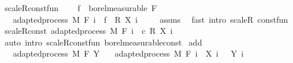 \begin{isabellebody}
\ scaleR{\isacharunderscore}{\kern0pt}const{\isacharunderscore}{\kern0pt}fun{\isacharcolon}{\kern0pt}\ \isanewline
\ \ \ {\isachardoublequoteopen}f\ {\isasymin}\ borel{\isacharunderscore}{\kern0pt}measurable\ {\isacharparenleft}{\kern0pt}F\ {\isasymbottom}{\isacharparenright}{\kern0pt}{\isachardoublequoteclose}\ \isanewline
\ \ \ {\isachardoublequoteopen}adapted{\isacharunderscore}{\kern0pt}process\ M\ F\ {\isacharparenleft}{\kern0pt}{\isasymlambda}i\ {\isasymxi}{\isachardot}{\kern0pt}\ f\ {\isasymxi}\ {\isacharasterisk}{\kern0pt}\isactrlsub R\ {\isacharparenleft}{\kern0pt}X\ i\ {\isasymxi}{\isacharparenright}{\kern0pt}{\isacharparenright}{\kern0pt}{\isachardoublequoteclose}\isanewline
%
\isadelimproof
\ \ %
\endisadelimproof
%
\isatagproof
{}\isamarkupfalse%
\ assms\ \isamarkupfalse%
\ {\isacharparenleft}{\kern0pt}fast\ intro{\isacharcolon}{\kern0pt}\ scaleR\ const{\isacharunderscore}{\kern0pt}fun{\isacharparenright}{\kern0pt}%
\endisatagproof
{\isafoldproof}%
%
\isadelimproof
\isanewline
%
\endisadelimproof
\isanewline
{}\isamarkupfalse%
\ scaleR{\isacharunderscore}{\kern0pt}const{\isacharcolon}{\kern0pt}\ {\isachardoublequoteopen}adapted{\isacharunderscore}{\kern0pt}process\ M\ F\ {\isacharparenleft}{\kern0pt}{\isasymlambda}i\ {\isasymxi}{\isachardot}{\kern0pt}\ c\ {\isacharasterisk}{\kern0pt}\isactrlsub R\ {\isacharparenleft}{\kern0pt}X\ i\ {\isasymxi}{\isacharparenright}{\kern0pt}{\isacharparenright}{\kern0pt}{\isachardoublequoteclose}%
\isadelimproof
\ %
\endisadelimproof
%
\isatagproof
{}\isamarkupfalse%
\ {\isacharparenleft}{\kern0pt}auto\ intro{\isacharcolon}{\kern0pt}\ scaleR{\isacharunderscore}{\kern0pt}const{\isacharunderscore}{\kern0pt}fun\ borel{\isacharunderscore}{\kern0pt}measurable{\isacharunderscore}{\kern0pt}const{\isacharparenright}{\kern0pt}%
\endisatagproof
{\isafoldproof}%
%
\isadelimproof
%
\endisadelimproof
\isanewline
\isanewline
{}\isamarkupfalse%
\ add{\isacharcolon}{\kern0pt}\isanewline
\ \ \ {\isachardoublequoteopen}adapted{\isacharunderscore}{\kern0pt}process\ M\ F\ Y{\isachardoublequoteclose}\isanewline
\ \ \ {\isachardoublequoteopen}adapted{\isacharunderscore}{\kern0pt}process\ M\ F\ {\isacharparenleft}{\kern0pt}{\isasymlambda}i\ {\isasymxi}{\isachardot}{\kern0pt}\ X\ i\ {\isasymxi}\ {\isacharplus}{\kern0pt}\ Y\ i\ {\isasymxi}{\isacharparenright}{\kern0pt}{\isachardoublequoteclose}\isanewline
%
\isadelimproof
%
\endisadelimproof
%
\isatagproof
{}\isamarkupfalse%

\end{isabellebody}
